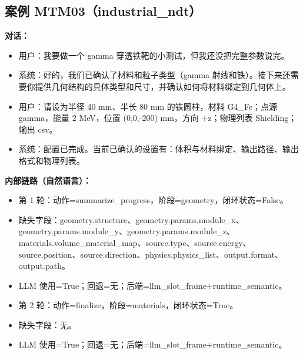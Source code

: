 \documentclass[11pt]{ctexart}
\begin{document}
\subsection{案例 MTM03（industrial\_ndt）}
\textbf{对话：}
\begin{itemize}
\item 用户：我要做一个 gamma 穿透铁靶的小测试，但我还没把完整参数说完。
\item 系统：好的，我们已确认了材料和粒子类型（gamma 射线和铁）。接下来还需要你提供几何结构的具体类型和尺寸，并确认如何将材料绑定到几何体上。
\item 用户：请设为半径 40 mm、半长 80 mm 的铁圆柱，材料 G4\_Fe；点源 gamma，能量 2 MeV，位置 (0,0,-200) mm，方向 +z；物理列表 Shielding；输出 csv。
\item 系统：配置已完成。当前已确认的设置有：体积与材料绑定、输出路径、输出格式和物理列表。
\end{itemize}
\textbf{内部链路（自然语言）：}
\begin{itemize}
\item 第 1 轮：动作=summarize\_progress，阶段=geometry，闭环状态=False。
\item 缺失字段：geometry.structure、geometry.params.module\_x、geometry.params.module\_y、geometry.params.module\_z、materials.volume\_material\_map、source.type、source.energy、source.position、source.direction、physics.physics\_list、output.format、output.path。
\item LLM 使用=True；回退=无；后端=llm\_slot\_frame+runtime\_semantic。
\item 第 2 轮：动作=finalize，阶段=materials，闭环状态=True。
\item 缺失字段：无。
\item LLM 使用=True；回退=无；后端=llm\_slot\_frame+runtime\_semantic。
\end{itemize}
\end{document}
